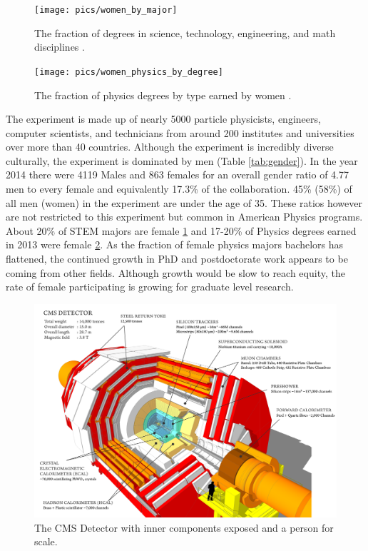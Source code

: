 \begin{figure}
\begin{center}
\texttt{[image: pics/women\_by\_major]}
\end{center}
\caption{The fraction of degrees in science, technology, engineering, and math disciplines \cite{aps}.}
\label{fig:women_majors}
\end{figure}
\begin{figure}
\begin{center}
\texttt{[image: pics/women\_physics\_by\_degree]}
\end{center}
\caption{The fraction of physics degrees by type earned by women \cite{aps}.}
\label{fig:women_degrees}
\end{figure}
The experiment is made up of nearly 5000 particle physicists, engineers, 
computer scientists, and technicians from around 200 institutes and universities over more than 40 countries. 
Although the experiment is incredibly diverse culturally, the experiment is  dominated by men
(Table \ref{tab:gender}). In the year 2014 there were 4119 Males and 863 females for an
overall gender ratio of 4.77 men to every female and equivalently 17.3\% of the collaboration. 45\% (58\%) of all men (women) in the experiment are under the age of 35.  These
ratios however are not restricted to this experiment but common in American Physics programs. 
About 20\% of STEM majors are female \ref{fig:women_majors} and 17-20\% of Physics degrees 
earned in 2013 were female \ref{fig:women_degrees}. As the fraction of female physics majors
 bachelors has flattened, 
the continued growth in PhD and postdoctorate
work appears to be coming from other fields. Although growth would be slow to reach equity, 
the rate of female participating is growing for graduate level research. 

\begin{figure}
\begin{center}
\includegraphics[width=.95\textwidth]{pics/cut_away_view}
\end{center}
\caption{The CMS Detector with inner components exposed and a person for scale.\label{fig:cms_onion}}
\end{figure}


